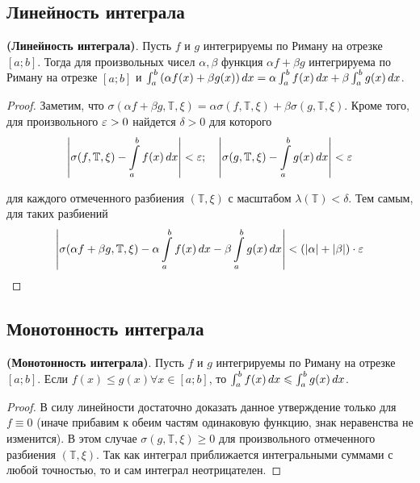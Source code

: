 \documentclass[a4paper]{article}
\theoremstyle{named}
\newcommand{\T}{\mathbb{T}}
\renewcommand{\int}{\intop}
\begin{document}
        \subsection{Линейность интеграла}

        \begin{proposal*}
            \textbf{(Линейность интеграла)}. Пусть $f$ и $g$ интегрируемы по Риману на отрезке $[a; b]$. Тогда для произвольных чисел $\alpha, \beta$ функция $\alpha f + \beta g$ интегрируема по Риману на отрезке $[a; b]$ и $\int_a^b \left(\alpha f(x) + \beta g(x)\right) \dd x = \alpha \int_a^b f(x) \dd x + \beta \int_a^b g(x) \dd x$.
        \end{proposal*}

        \begin{proof}
            Заметим, что $\sigma(\alpha f + \beta g, \T, \xi) = \alpha \sigma(f, \T, \xi) + \beta \sigma(g, \T, \xi)$. Кроме того, для произвольного $\varepsilon > 0$ найдется $\delta > 0$ для которого
            \begin{equation*}
                \left|\sigma(f, \T, \xi) - \int_a^b f(x) \dd x\right| < \eps; \quad
                \left|\sigma(g, \T, \xi) - \int_a^b g(x) \dd x\right| < \eps
            \end{equation*}

            для каждого отмеченного разбиения $(\T, \xi)$ с масштабом $\lambda(\T) < \delta$. Тем самым, для таких разбиений
            \begin{equation*}
                \left|\sigma(\alpha f + \beta g, \T, \xi) - \alpha \int_a^b f(x) \dd x - \beta \int_a^b g(x) \dd x\right| < (|\alpha| + |\beta|) \cdot \eps
            \end{equation*}
        \end{proof}

        \subsection{Монотонность интеграла} 

        \begin{proposal*}
            \textbf{(Монотонность интеграла)}. Пусть $f$ и $g$ интегрируемы по Риману на отрезке $[a; b]$. Если $f(x) \leq g(x) \forall x \in [a; b]$, то $\int_a^b f(x) \dd x \leq \int_a^b g(x) \dd x$.
        \end{proposal*}

        \begin{proof}
            В силу линейности достаточно доказать данное утверждение только для $f \equiv 0$ (иначе прибавим к обеим частям одинаковую функцию, знак неравенства не изменится). В этом случае $\sigma(g, \T, \xi) \geq 0$ для произвольного отмеченного разбиения $(\T, \xi)$. Так как интеграл приближается интегральными суммами с любой точностью, то и сам интеграл неотрицателен.
        \end{proof}
\end{document}

